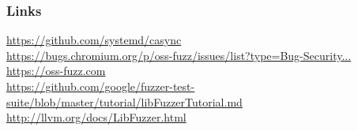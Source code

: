 \documentclass[serif]{beamer}
\begin{document}
\begin{frame}[fragile]
  \frametitle{Links}

  \url{https://github.com/systemd/casync}\\
  {\small
    \href{https://bugs.chromium.org/p/oss-fuzz/issues/list?can=1&q=type=Bug-Security,Bug%20-component:Infra%20status:Fixed,Verified&sort=-id&colspec=ID%20Type%20Component%20Status%20Library%20Reported%20Owner%20Summary}{https://bugs.chromium.org/p/oss-fuzz/issues/list?type=Bug-Security...}\hspace*{-2cm}
  }\\

  \url{https://oss-fuzz.com}\\
    
  \url{https://github.com/google/fuzzer-test-suite/blob/master/tutorial/libFuzzerTutorial.md}\\

  \url{http://llvm.org/docs/LibFuzzer.html}

\end{frame}
\end{document}
